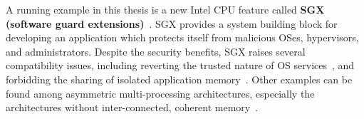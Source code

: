 A running example in this thesis %
is a new Intel CPU feature called {\bf SGX (software guard extensions)}~\cite{intelsgx}.
SGX provides a system building block for developing
an application which protects itself from malicious OSes, hypervisors, and administrators.
Despite the security benefits,
SGX raises several compatibility issues, including reverting the trusted nature of OS services~\cite{baumann14haven,osdi16scone,tsai17graphene-sgx}, and forbidding the sharing of isolated application memory~\cite{shinde17panoply}.
Other examples can be found among asymmetric multi-processing architectures,
especially the architectures without inter-connected, coherent memory~\cite{gschwind2007,cascaval2002evaluation}. 



